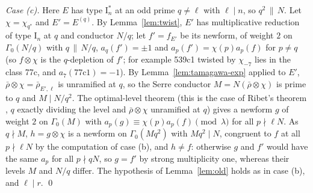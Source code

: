 \documentclass[11pt]{amsart}
\theoremstyle{definition}
\begin{document}
\medskip\noindent\emph{Case (c).} Here $E$ has type $\mathrm{I}_n^*$ at an odd prime $q\ne\ell$ with $\ell\mid n$, so $q^2\,\|\,N$. Let $\chi=\chi_{q^*}$ and $E'=E^{(q)}$. By Lemma~\ref{lem:twist}, $E'$ has multiplicative reduction of type $\mathrm{I}_n$ at $q$ and conductor $N/q$; let $f'=f_{E'}$ be its newform, of weight $2$ on $\Gamma_0(N/q)$ with $q\,\|\,N/q$, $a_q(f')=\pm1$ and $a_p(f')=\chi(p)a_p(f)$ for $p\ne q$ (so $f\otimes\chi$ is the $q$-depletion of $f'$; for example 539c1 twisted by $\chi_{-7}$ lies in the class 77c, and $a_7(\text{77c1})=-1$). By Lemma~\ref{lem:tamagawa-exp} applied to $E'$, $\bar\rho\otimes\chi=\bar\rho_{E',\ell}$ is unramified at $q$, so the Serre conductor $M=N(\bar\rho\otimes\chi)$ is prime to $q$ and $M\mid N/q^2$. The optimal-level theorem (this is the case of Ribet's theorem \cite{Ribet90}, $q$ exactly dividing the level and $\bar\rho\otimes\chi$ unramified at $q$) gives a newform $g$ of weight $2$ on $\Gamma_0(M)$ with $a_p(g)\equiv\chi(p)a_p(f)\pmod\lambda$ for all $p\nmid\ell N$. As $q\nmid M$, $h=g\otimes\chi$ is a newform on $\Gamma_0(Mq^2)$ with $Mq^2\mid N$, congruent to $f$ at all $p\nmid\ell N$ by the computation of case (b), and $h\ne f$: otherwise $g$ and $f'$ would have the same $a_p$ for all $p\nmid qN$, so $g=f'$ by strong multiplicity one, whereas their levels $M$ and $N/q$ differ. The hypothesis of Lemma~\ref{lem:old} holds as in case (b), and $\ell\mid r$. \qed
\end{document}
